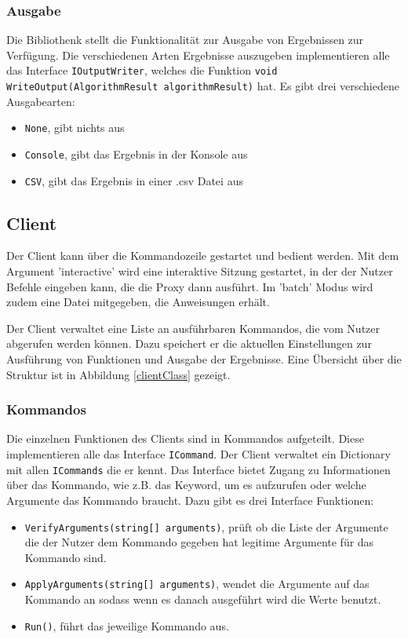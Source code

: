 \subsubsection{Ausgabe}

Die Bibliothenk stellt die Funktionalität zur Ausgabe von Ergebnissen zur Verfügung. Die verschiedenen Arten Ergebnisse auszugeben implementieren alle
das Interface \verb|IOutputWriter|, welches die Funktion \verb|void WriteOutput(AlgorithmResult algorithmResult)| hat. Es gibt drei verschiedene Ausgabearten:

\begin{itemize}
  \item \verb|None|, gibt nichts aus
  \item \verb|Console|, gibt das Ergebnis in der Konsole aus
  \item \verb|CSV|, gibt das Ergebnis in einer .csv Datei aus
\end{itemize}


\subsection{Client}

Der Client kann über die Kommandozeile gestartet und bedient werden. Mit dem Argument 'interactive' wird eine interaktive Sitzung gestartet,
in der der Nutzer Befehle eingeben kann, die die Proxy dann ausführt. Im 'batch' Modus wird zudem eine Datei mitgegeben, die Anweisungen erhält.

Der Client verwaltet eine Liste an ausführbaren Kommandos, die vom Nutzer abgerufen werden können. Dazu speichert er die aktuellen Einstellungen zur Ausführung von Funktionen und Ausgabe der Ergebnisse. Eine Übersicht über die Struktur ist in Abbildung \ref{clientClass} gezeigt.



\subsubsection{Kommandos}

Die einzelnen Funktionen des Clients sind in Kommandos aufgeteilt.
Diese implementieren alle das Interface \verb|ICommand|. Der Client verwaltet ein Dictionary mit allen \verb|ICommands| die er kennt.
Das Interface bietet Zugang zu Informationen über das Kommando, wie z.B. das Keyword, um es aufzurufen oder welche Argumente das Kommando braucht.
Dazu gibt es drei Interface Funktionen:

\begin{itemize}
  \item \verb|VerifyArguments(string[] arguments)|, prüft ob die Liste der Argumente die der Nutzer dem Kommando gegeben hat legitime Argumente für das Kommando sind.
  \item \verb|ApplyArguments(string[] arguments)|, wendet die Argumente auf das Kommando an sodass wenn es danach ausgeführt wird die Werte benutzt.
  \item \verb|Run()|, führt das jeweilige Kommando aus.
\end{itemize}

